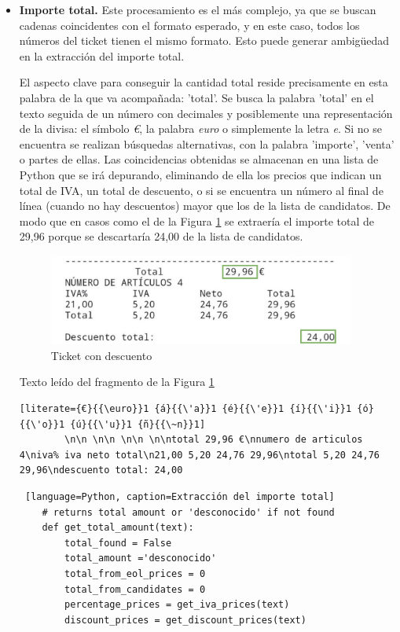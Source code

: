 \begin{itemize}
    \item \textbf{Importe total.} Este procesamiento es el más complejo, ya que se buscan cadenas coincidentes con el formato esperado, y en este caso, todos los números del ticket tienen el mismo formato. Esto puede generar ambigüedad en la extracción del importe total.

    El aspecto clave para conseguir la cantidad total reside precisamente en esta palabra de la que va acompañada: 'total'. Se busca la palabra 'total' en el texto seguida de un número con decimales y posiblemente una representación de la divisa: el símbolo \textit{€}, la palabra \textit{euro} o simplemente la letra \textit{e}.  Si no se encuentra se realizan búsquedas alternativas, con la palabra 'importe', 'venta' o partes de ellas. Las coincidencias obtenidas se almacenan en una lista de Python que se irá depurando, eliminando de ella los precios que indican un total de IVA, un total de descuento, o si se encuentra un número al final de línea (cuando no hay descuentos) mayor que los de la lista de candidatos. De modo que en casos como el de la Figura \ref{fig:get_total_amount_peculiaridades} se extraería el importe total de 29,96 porque se descartaría 24,00 de la lista de candidatos.

    \begin{figure}[ht!]
        \centering
        \includegraphics[height=30mm]{imagenes/get_total_amount_peculiaridades.png}
        \caption{Ticket con descuento}
        \label{fig:get_total_amount_peculiaridades}
    \end{figure}

Texto leído del fragmento de la Figura \ref{fig:get_total_amount_peculiaridades}
    \begin{lstlisting}[literate={€}{{\euro}}1 {á}{{\'a}}1 {é}{{\'e}}1 {í}{{\'i}}1 {ó}{{\'o}}1 {ú}{{\'u}}1 {ñ}{{\~n}}1]
        \n\n \n\n \n\n \n\ntotal 29,96 €\nnumero de articulos 4\niva% iva neto total\n21,00 5,20 24,76 29,96\ntotal 5,20 24,76 29,96\ndescuento total: 24,00
    \end{lstlisting}

    \begin{lstlisting} [language=Python, caption=Extracción del importe total]
    # returns total amount or 'desconocido' if not found
    def get_total_amount(text):
        total_found = False
        total_amount ='desconocido'
        total_from_eol_prices = 0
        total_from_candidates = 0
        percentage_prices = get_iva_prices(text)
        discount_prices = get_discount_prices(text)


\end{lstlisting}
\end{itemize}
